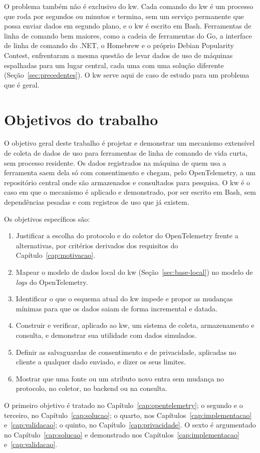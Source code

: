 O problema também não é exclusivo do kw. Cada comando do kw é um processo que
roda por segundos ou minutos e termina, sem um serviço permanente que possa
enviar dados em segundo plano, e o kw é escrito em Bash. Ferramentas de linha
de comando bem maiores, como a cadeia de ferramentas do Go, a interface de
linha de comando do .NET, o Homebrew e o próprio Debian Popularity Contest,
enfrentaram a mesma questão de levar dados de uso de máquinas espalhadas para
um lugar central, cada uma com uma solução diferente
(Seção~\ref{sec:precedentes}). O kw serve aqui de caso de estudo para um
problema que é geral.

\section{Objetivos do trabalho}
\label{sec:objetivos}

O objetivo geral deste trabalho é projetar e demonstrar um mecanismo
extensível de coleta de dados de uso para ferramentas de linha de comando de
vida curta, sem processo residente. Os dados registrados na máquina de quem
usa a ferramenta saem dela só com consentimento e chegam, pelo OpenTelemetry,
a um repositório central onde são armazenados e consultados para pesquisa. O
kw é o caso em que o mecanismo é aplicado e demonstrado, por ser escrito em
Bash, sem dependências pesadas e com registros de uso que já existem.

Os objetivos específicos são:
\begin{enumerate}
  \item Justificar a escolha do protocolo e do coletor do OpenTelemetry frente
    a alternativas, por critérios derivados dos requisitos do
    Capítulo~\ref{cap:motivacao}.
  \item Mapear o modelo de dados local do kw (Seção~\ref{sec:base-local}) no
    modelo de \textit{logs} do OpenTelemetry.
  \item Identificar o que o esquema atual do kw impede e propor as mudanças
    mínimas para que os dados saiam de forma incremental e datada.
  \item Construir e verificar, aplicado ao kw, um sistema de coleta,
    armazenamento e consulta, e demonstrar sua utilidade com dados simulados.
  \item Definir as salvaguardas de consentimento e de privacidade, aplicadas
    no cliente a qualquer dado enviado, e dizer os seus limites.
  \item Mostrar que uma fonte ou um atributo novo entra sem mudança no
    protocolo, no coletor, no backend ou na consulta.
\end{enumerate}
O primeiro objetivo é tratado no Capítulo~\ref{cap:opentelemetry}; o segundo
e o terceiro, no Capítulo~\ref{cap:solucao}; o quarto, nos
Capítulos~\ref{cap:implementacao} e~\ref{cap:validacao}; o quinto, no
Capítulo~\ref{cap:privacidade}. O sexto é argumentado no
Capítulo~\ref{cap:solucao} e demonstrado nos Capítulos~\ref{cap:implementacao}
e~\ref{cap:validacao}.

